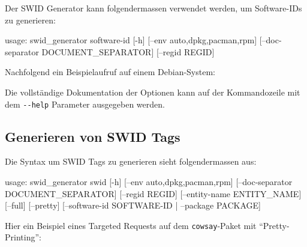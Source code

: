 Der SWID Generator kann folgendermassen verwendet werden, um Software-IDs zu
generieren:

\begin{textcode}
usage: swid_generator software-id [-h] [--env {auto,dpkg,pacman,rpm}]
                                  [--doc-separator DOCUMENT_SEPARATOR]
                                  [--regid REGID]
\end{textcode}

Nachfolgend ein Beispielaufruf auf einem Debian-System:


Die vollständige Dokumentation der Optionen kann auf der Kommandozeile mit dem
\texttt{-{}-help} Parameter ausgegeben werden.


\subsection{Generieren von SWID Tags}

Die Syntax um SWID Tags zu generieren sieht folgendermassen aus:

\begin{textcode}
usage: swid_generator swid [-h] [--env {auto,dpkg,pacman,rpm}]
                           [--doc-separator DOCUMENT_SEPARATOR]
                           [--regid REGID] [--entity-name ENTITY_NAME]
                           [--full] [--pretty]
                           [--software-id SOFTWARE-ID | --package PACKAGE]
\end{textcode}

Hier ein Beispiel eines Targeted Requests auf dem \texttt{cowsay}-Paket mit
\enquote{Pretty-Printing}:




